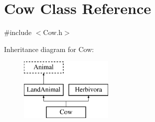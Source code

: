 \hypertarget{classCow}{\section{Cow Class Reference}
\label{classCow}
}


{\ttfamily \#include $<$Cow.\-h$>$}

Inheritance diagram for Cow\-:\begin{figure}[H]
\begin{center}
\leavevmode
\includegraphics[height=3.000000cm]{classCow}
\end{center}
\end{figure}
